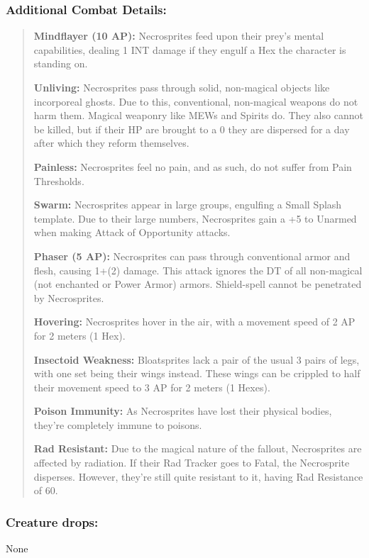 \documentclass[11pt,a4paper,twocolumn]{book}
\begin{document}
	\subsubsection*{Additional Combat Details:}
	\begin{verse}
		\textbf{Mindflayer (10 AP):} Necrosprites feed upon their prey's mental capabilities, dealing 1 INT damage if they engulf a Hex the character is standing on.
		
		\textbf{Unliving:} Necrosprites pass through solid, non-magical objects like incorporeal ghosts. Due to this, conventional, non-magical weapons do not harm them. Magical weaponry like MEWs and Spirits do. They also cannot be killed, but if their HP are brought to a 0 they are dispersed for a day after which they reform themselves.
		
		\textbf{Painless: }Necrosprites feel no pain, and as such, do not suffer from Pain Thresholds.
		
		\textbf{Swarm: }Necrosprites appear in large groups, engulfing a Small Splash template. Due to their large numbers, Necrosprites gain a +5 to Unarmed when making Attack of Opportunity attacks. 
		
		\textbf{Phaser (5 AP):} Necrosprites can pass through conventional armor and flesh, causing 1+(2) damage. This attack ignores the DT of all non-magical (not enchanted or Power Armor) armors. Shield-spell cannot be penetrated by Necrosprites.
		
		\textbf{Hovering:} Necrosprites hover in the air, with a movement speed of 2 AP for 2 meters (1 Hex).
		
		\textbf{Insectoid Weakness:} Bloatsprites lack a pair of the usual 3 pairs of legs, with one set being their wings instead. These wings can be crippled to half their movement speed to 3 AP for 2 meters (1 Hexes).
		
		\textbf{Poison Immunity:} As Necrosprites have lost their physical bodies, they're completely immune to poisons.
		
		\textbf{Rad Resistant:} Due to the magical nature of the fallout, Necrosprites are affected by radiation. If their Rad Tracker goes to Fatal, the Necrosprite disperses. However, they're still quite resistant to it, having Rad Resistance of 60.
	\end{verse}
	
	\subsubsection*{Creature drops:}
	None
	
\end{document}
